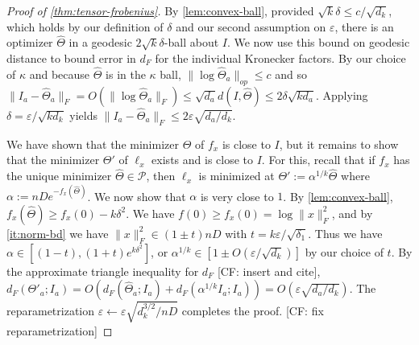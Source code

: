 \documentclass{article}
\newcommand\eps{\varepsilon}
\newcommand\SPD{\mathcal{P}}
\newcommand\samp{x}
\newcommand{\CF}[1]{{\color{purple}[CF: #1]}}
\begin{document}
\begin{proof}[Proof of \cref{thm:tensor-frobenius}]

By \cref{lem:convex-ball}, provided $\sqrt{k} \delta \leq c/\sqrt{d_k}$, which holds by our definition of $\delta$ and our second assumption on $\eps$, there is an optimizer $\widehat{\Theta}$ in a geodesic $2 \sqrt{k} \delta$-ball about $I$. We now use this bound on geodesic distance to bound error in $d_F$ for the individual Kronecker factors. By our choice of $\kappa$ and because $\widehat{\Theta}$ is in the $\kappa$ ball, $\|\log \widehat{\Theta}_a\|_{op} \leq c$ and so $\|I_a - \widehat{\Theta}_a\|_F = O( \| \log \widehat{\Theta}_a\|_F) \leq \sqrt{d_a} d(I, \widehat{\Theta}) \leq 2\delta \sqrt{ k d_a}.$ Applying $\delta = \eps /\sqrt{k d_k}$ yields $\| I_a - \widehat{\Theta}_a\|_F \leq 2\eps \sqrt{ d_a/d_k}$.

We have shown that the minimizer $\widehat{\Theta}$ of $f_\samp$ is close to $I$, but it remains to show that the minimizer $\Theta'$ of $\ell_\samp$ exists and is close to $I$. For this, recall that if $f_\samp$ has the unique minimizer $\widehat{\Theta} \in \SPD$, then $\ell_\samp$ is minimized at $\Theta':= \alpha^{1/k}  \widehat{\Theta}$ where $\alpha:= n D e^{ - f_\samp(\widehat{\Theta})}$. We now show that $\alpha$ is very close to $1$. By \cref{lem:convex-ball}, $f_\samp(\widehat{\Theta}) \geq f_\samp(0) - k\delta^2$. We have $f(0) \geq f_\samp(0) = \log\| \samp\|^2_F$, and by \cref{it:norm-bd} we have $\| \samp\|_F^2 \in (1 \pm t) nD$ with $t = k \eps/\sqrt{\delta_1}$. Thus we have $\alpha \in [(1-t),  (1+t) e^{k \delta^2}]$, or $\alpha^{1/k} \in [1 \pm  O(\eps/\sqrt{d_k})]$ by our choice of $t$. By the approximate triangle inequality for $d_F$ \CF{insert and cite}, $d_F( \Theta'_a; I_a) = O(d_F(\widehat{\Theta}_a; I_a) + d_F(\alpha^{1/k} I_a; I_a)) = O(\eps \sqrt{d_a/d_k})$. The reparametrization $\eps \leftarrow \eps \sqrt{d_k^{3/2}/ n D}$ completes the proof. \CF{fix reparametrization}
\end{proof}



\end{document}
